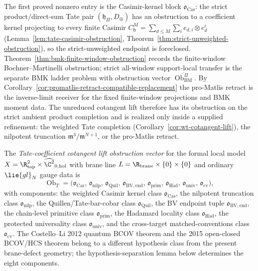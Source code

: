 \documentclass[11pt]{memoir}
\begin{document}
The first proved nonzero entry is the Casimir-kernel block
\(\mathfrak o_{\mathrm{Cas}}\): the strict product/direct-sum Tate
pair \((\mathfrak h_\Pi,D_\oplus)\) has an obstruction to a coefficient kernel
projecting to every finite Casimir
\(C^M_{\mathfrak h}=\sum_{d\le M}\sum_i e_{d,i}\otimes e^i_d\)
(Lemma~\ref{lem:tate-casimir-obstruction},
Theorem~\ref{thm:strict-unweighted-obstruction}), so the strict-unweighted
endpoint is foreclosed.  Theorem~\ref{thm:bmk-finite-window-obstruction}
records the finite-window Bochner--Martinelli obstruction; strict
all-window support-local transfer is the separate BMK ladder problem
with obstruction vector
\(\operatorname{Ob}^\Pi_{\mathrm{BM}}\).  By
Corollary~\ref{cor:promatlis-retract-compatible-replacement} the pro-Matlis
retract is the inverse-limit receiver for the fixed finite-window
projections and BMK moment data.  The unreduced cotangent
lift therefore has its obstruction on the strict ambient product
completion and is realized only inside a supplied refinement: the weighted Tate
completion (Corollary~\ref{cor:wt-cotangent-lift}), the nilpotent
truncation \(\mathfrak m^3/\mathfrak m^{N+1}\), or the pro-Matlis
retract.

\begin{defn}\label{defn:tate-cotangent-lift-obstruction-vector}
  The \emph{Tate-coefficient cotangent lift obstruction vector} for the
  formal local model
  \(X=\R^2_{\mathrm{top}}\times\widehat{\C^2}_{0,\mathrm{hol}}\) with
  brane line \(L=\R_{\mathrm{brane}}\times\{0\}\times\{0\}\) and
  ordinary \(\lie{gl}_N\) gauge data is
  \[
    \operatorname{Ob}_T
      =
      \bigl(
        \mathfrak o_{\mathrm{Cas}},\,
        \mathfrak o_{\mathrm{nilp}},\,
        \mathfrak o_{\mathrm{Quil}},\,
        \mathfrak o_{\mathrm{BV,end}},\,
        \mathfrak o_{\mathrm{prim}},\,
        \mathfrak o_{\mathrm{Had}},\,
        \mathfrak o_{\mathrm{univ}},\,
        \mathfrak o_{\mathrm{cv}}
      \bigr),
  \]
  with components: the weighted Casimir kernel class
  \(\mathfrak o_{\mathrm{Cas}}\), the nilpotent truncation class
  \(\mathfrak o_{\mathrm{nilp}}\), the Quillen/Tate-bar-cobar class
  \(\mathfrak o_{\mathrm{Quil}}\), the BV endpoint tuple
  \(\mathfrak o_{\mathrm{BV,end}}\), the chain-level primitive class
  \(\mathfrak o_{\mathrm{prim}}\), the Hadamard locality class
  \(\mathfrak o_{\mathrm{Had}}\), the protected universality class
  \(\mathfrak o_{\mathrm{univ}}\), and the cross-target
  matched-conventions class \(\mathfrak o_{\mathrm{cv}}\).  The
  Costello--Li 2012 quantum BCOV theorem and the 2015 open-closed
  BCOV/HCS theorem belong to a different hypothesis
  class from the present brane-defect geometry; the hypothesis-separation lemma
  below determines the eight components.
\end{defn}
\end{document}
